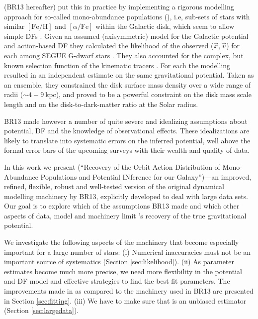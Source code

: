 \citet{2013ApJ...779..115B} (BR13 hereafter) put this in practice by implementing a rigorous modelling approach for so-called mono-abundance populations (\MAPs{}), i.e, sub-sets of stars with similar $[\mathrm{Fe}/\mathrm{H}]$ and $[\alpha/\mathrm{Fe}]$ within the Galactic disk, which seem to allow simple DFs \citep{2012ApJ...751..131B,2012ApJ...755..115B,2012ApJ...753..148B}. Given an assumed (axisymmetric) model for the Galactic potential and action-based DF \citep{2010MNRAS.401.2318B,2011MNRAS.413.1889B,2013MNRAS.434..652T} they calculated the likelihood of the observed ($\vec{x},\vec{v}$) for each \MAP{} among SEGUE G-dwarf stars \citep{2009AJ....137.4377Y}. They also accounted for the complex, but known selection function of the kinematic tracers \citep{2012ApJ...753..148B}. For each \MAP{} the modelling resulted in an independent estimate on the same gravitational potential. Taken as an ensemble, they constrained the disk surface mass density over a wide range of radii ($\sim 4-9~\text{kpc}$), and proved to be a powerful constraint on the disk mass scale length and on the disk-to-dark-matter ratio at the Solar radius. 

BR13 made however a number of quite severe and idealizing assumptions about potential, DF and the knowledge of observational effects. These idealizations are likely to translate into systematic errors on the inferred potential, well above the formal error bars of the upcoming surveys with their wealth and quality of data.

In this work we present \RM{} (``\textsc{R}ecovery of the \textsc{O}rbit \textsc{A}ction \textsc{D}istribution of \textsc{M}ono-\textsc{A}bundance \textsc{P}opulations and \textsc{P}otential \textsc{IN}ference for our \textsc{G}alaxy'')---an improved, refined, flexible, robust and well-tested version of the original dynamical modelling machinery by BR13, explicitly developed to deal with large data sets. Our goal is to explore which of the assumptions BR13 made and which other aspects of data, model and machinery limit \RM{}'s recovery of the true gravitational potential.

We investigate the following aspects of the \RM{} machinery that become especially important for a large number of stars: (i) Numerical inaccuracies must not be an important source of systematics (Section \ref{sec:likelihood}). (ii) As parameter estimates become much more precise, we need more flexibility in the potential and DF model and effective strategies to find the best fit parameters. The improvements made in \RM{} as compared to the machinery used in BR13 are presented in Section \ref{sec:fitting}. (iii) We have to make sure that \RM{} is an unbiased estimator (Section \ref{sec:largedata}).

